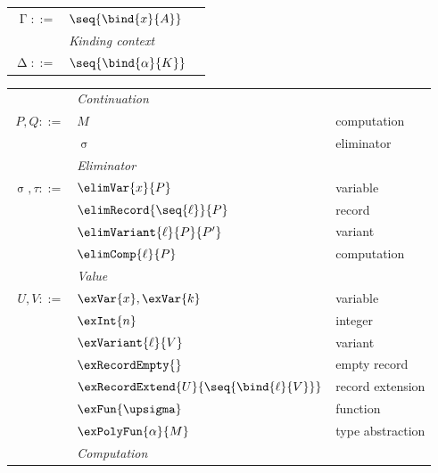 \begin{figure}
{\begin{minipage}[t]{0.46\textwidth}
\begin{tabularx}{\textwidth}{rL{2.6cm}L{3cm}}
      $\upGamma ::=$
      &
      $\seq{\bind{x}{A}}$
      \\[2mm]
      &\textit{Kinding context}&
      \\
      $\upDelta ::=$
      &
      $\seq{\bind{\alpha}{K}}$
\end{tabularx}
   \end{minipage}%
   \hspace{4mm}
   \begin{minipage}[t]{0.50\textwidth}
      \begin{tabularx}{\textwidth}{rL{3.9cm}L{3cm}}
         &\textit{Continuation}&
         \\
         $P, Q ::=$
         &
         $M$
         &
         computation
         \\
         &
         $\upsigma$
         &
         eliminator
         \\[2mm]
         &\textit{Eliminator}&
         \\
         $\upsigma, \tau ::=$
         &
         $\elimVar{x}{P}$
         &
         variable
         \\
         &
         $\elimRecord{\seq{\ell}}{P}$
         &
         record
         \\
         &
         $\elimVariant{\ell}{P}{P'}$
         &
         variant
         \\
         &
         $\elimComp{\ell}{P}$
         &
         computation
         \\[2mm]
         &\textit{Value}&
         \\
         $U, V ::=$
         &
         $\exVar{x}, \exVar{k}$
         &
         variable
         \\
         &
         $\exInt{n}$
         &
         integer
         \\
         &
         $\exVariant{\ell}{V}$
         &
         variant
         \\
         &
         $\exRecordEmpty{}$
         &
         empty record
         \\
         &
         $\exRecordExtend{U}{\seq{\bind{\ell}{V}}}$
         &
         record extension
         \\
         &
         $\exFun{\upsigma}$
         &
         function
         \\
         &
         $\exPolyFun{\alpha}{M}$
         &
         type abstraction
         \\[2mm]
         &\textit{Computation}&
         \\

\end{tabularx}
\end{minipage}}
\end{figure}
